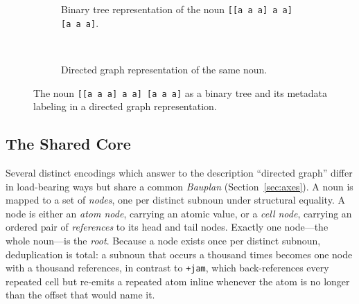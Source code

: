 \documentclass[twoside]{article}
\begin{document}
\begin{figure}[htp]
\begin{subfigure}{\textwidth}
      \caption{Binary tree representation of the noun \texttt{[[a a a] a a] [a a a]}.}
      \label{fig:binary-tree}
    \end{subfigure}
    \\
    \begin{subfigure}{\textwidth}
      \centering
      \caption{Directed graph representation of the same noun.}
      \label{fig:directed-graph}
    \end{subfigure}
  \caption{The noun \texttt{[[a a a] a a] [a a a]} as a binary tree and its metadata labeling in a directed graph representation.}
  \label{fig:binary-tree-dag}
\end{figure}

\subsection{The Shared Core}

Several distinct encodings which answer to the description ``directed graph'' differ in load-bearing ways but share a common \emph{Bauplan} (Section~\ref{sec:axes}).  A noun is mapped to a set of \emph{nodes}, one per distinct subnoun under structural equality.  A node is either an \emph{atom node}, carrying an atomic value, or a \emph{cell node}, carrying an ordered pair of \emph{references} to its head and tail nodes.  Exactly one node---the whole noun---is the \emph{root}.  Because a node exists once per distinct subnoun, deduplication is total:  a subnoun that occurs a thousand times becomes one node with a thousand references, in contrast to \texttt{+jam}, which back-references every repeated cell but re-emits a repeated atom inline whenever the atom is no longer than the offset that would name it.
\end{document}
